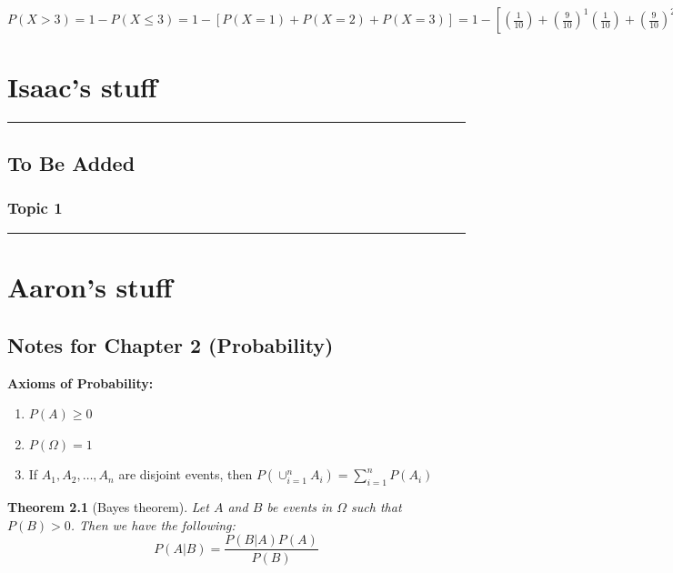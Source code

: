 \documentclass[
]{book}
\newtheorem{theorem}{Theorem}[chapter]
\theoremstyle{definition}
\theoremstyle{definition}
\theoremstyle{definition}
\theoremstyle{definition}
\theoremstyle{remark}
\begin{document}
\(P(X > 3) = 1 - P(X \leq 3) = 1 - [P(X = 1) + P(X = 2) + P(X = 3)] = 1 - [(\frac{1}{10}) + (\frac{9}{10})^1(\frac{1}{10}) + (\frac{9}{10})^2(\frac{1}{10})] = .729\)

\hypertarget{isaacs-stuff}{%
\chapter{Isaac's stuff}\label{isaacs-stuff}}

\begin{center}\rule{0.5\linewidth}{0.5pt}\end{center}

\hypertarget{to-be-added-2}{%
\section{To Be Added}\label{to-be-added-2}}

\hypertarget{topic-1-1}{%
\subsection{Topic 1}\label{topic-1-1}}

\begin{center}\rule{0.5\linewidth}{0.5pt}\end{center}

\hypertarget{aarons-stuff}{%
\chapter{Aaron's stuff}\label{aarons-stuff}}

\hypertarget{notes-for-chapter-2-probability}{%
\section{Notes for Chapter 2 (Probability)}\label{notes-for-chapter-2-probability}}

\textbf{Axioms of Probability:}

\begin{enumerate}
\def\labelenumi{\arabic{enumi}.}
\item
  \(P(A) \geq 0\)
\item
  \(P(\Omega)=1\)
\item
  If \(A_1, A_2, \ldots, A_n\) are disjoint events, then \(P(\cup_{i=1}^n A_i) = \sum_{i=1}^n P(A_i)\)
\end{enumerate}

\begin{theorem}[Bayes theorem]
Let \(A\) and \(B\) be events in \(\Omega\) such that \(P(B)>0\). Then we have the following:
\[
P(A|B) = \frac{P(B|A)P(A)}{P(B)}
\]
\end{theorem}
\end{document}

